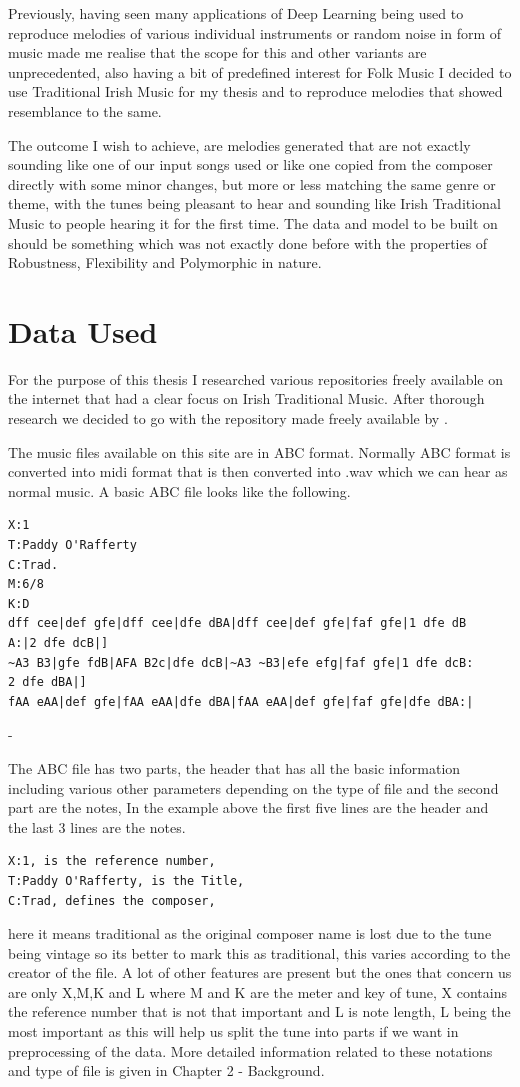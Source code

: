 \documentclass[oneside,12pt]{Classes/RoboticsLaTeX}
\begin{document}
Previously, having seen many applications of Deep Learning being used to reproduce melodies of various individual instruments or random noise in form of music made me realise that the scope for this and other variants are unprecedented, also having a bit of predefined interest for Folk Music I decided to use Traditional Irish Music for my thesis and to reproduce melodies that showed resemblance to the same.

The outcome I wish to achieve, are melodies generated that are not exactly sounding like one of our input songs used or like one copied from the composer directly with some minor changes, but more or less matching the same genre or theme, with the tunes being pleasant to hear and sounding like Irish Traditional Music to people hearing it for the first time. The data and model to be built on should be something which was not exactly done before with the properties of Robustness, Flexibility and Polymorphic in nature.

\section{Data Used}
For the purpose of this thesis I researched various repositories freely available on the internet that had a clear focus on Irish Traditional Music. After thorough research we decided to go with the repository made freely available by \cite{session}.

The music files available on this site are in ABC format. Normally ABC format is converted into midi format that is then converted into .wav which we can hear as normal music. A basic ABC file looks like the following. 
\begin{verbatim}
X:1
T:Paddy O'Rafferty  
C:Trad.  
M:6/8  
K:D  
dff cee|def gfe|dff cee|dfe dBA|dff cee|def gfe|faf gfe|1 dfe dB
A:|2 dfe dcB|]  
~A3 B3|gfe fdB|AFA B2c|dfe dcB|~A3 ~B3|efe efg|faf gfe|1 dfe dcB:
2 dfe dBA|]  
fAA eAA|def gfe|fAA eAA|dfe dBA|fAA eAA|def gfe|faf gfe|dfe dBA:|
\end{verbatim}
-\cite{abcnotation}

The ABC file has two parts, the header that has all the basic information including various other parameters depending on the type of file and the second part are the notes, In the example above the first five lines are the header and the last 3 lines are the notes.
\begin{verbatim}
X:1, is the reference number,
T:Paddy O'Rafferty, is the Title, 
C:Trad, defines the composer,
\end{verbatim}here it means traditional as the original composer name is lost due to the tune being vintage so its better to mark this as traditional, this varies according to the creator of the file.
A lot of other features are present but the ones that concern us are only X,M,K and L where M and K are the meter and key of tune, X contains the reference number that is not that important and L is note length, L being the most important as this will help us split the tune into parts if we want in preprocessing of the data.
More detailed information related to these notations and type of file is given in Chapter 2 - Background.
\end{document}

